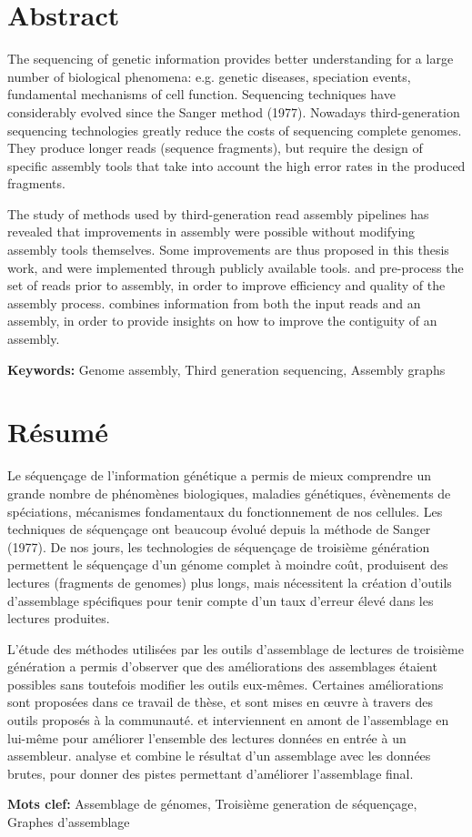 \documentclass[main.tex]{subfiles}
\begin{document}
\pagestyle{empty}

\section*{Abstract}

The sequencing of genetic information provides better understanding for a large number of biological phenomena: e.g. genetic diseases, speciation events, fundamental mechanisms of cell function. Sequencing techniques have considerably evolved since the Sanger method (1977). Nowadays third-generation sequencing technologies greatly reduce the costs of sequencing complete genomes. They produce longer reads (sequence fragments), but require the design of specific assembly tools that take into account the high error rates in the produced fragments.

The study of methods used by third-generation read assembly pipelines has revealed that improvements in assembly were possible without modifying assembly tools themselves. Some improvements are thus proposed in this thesis work, and were implemented through publicly available tools. \yacrd and \fpa pre-process the set of reads prior to assembly, in order to improve efficiency and quality of the assembly process. \knot combines information from both the input reads and an assembly, in order to provide insights on how to improve the contiguity of an assembly.

\textbf{Keywords:} Genome assembly, Third generation sequencing, Assembly graphs

\section*{Résumé}

Le séquençage de l'information génétique a permis de mieux comprendre un grande nombre de phénomènes biologiques, maladies génétiques, évènements de spéciations, mécanismes fondamentaux du fonctionnement de nos cellules. Les techniques de séquençage ont beaucoup évolué depuis la méthode de Sanger (1977). De nos jours, les technologies de séquençage de troisième génération permettent le séquençage d'un génome complet à moindre coût, produisent des lectures (fragments de genomes) plus longs, mais nécessitent la création d'outils d'assemblage spécifiques pour tenir compte d'un taux d'erreur élevé dans les lectures produites.

L'étude des méthodes utilisées par les outils d'assemblage de lectures de troisième génération a permis d'observer que des améliorations des assemblages étaient possibles sans toutefois modifier les outils eux-mêmes. Certaines améliorations sont proposées dans ce travail de thèse, et sont mises en œuvre à travers des outils proposés à la communauté. \yacrd et \fpa  interviennent en amont de l'assemblage en lui-même pour améliorer l'ensemble des lectures données en entrée à un assembleur. \knot analyse et combine le résultat d'un assemblage avec les données brutes, pour donner des pistes permettant d'améliorer l'assemblage final.

\textbf{Mots clef:} Assemblage de génomes, Troisième generation de séquençage, Graphes d'assemblage
\end{document}
